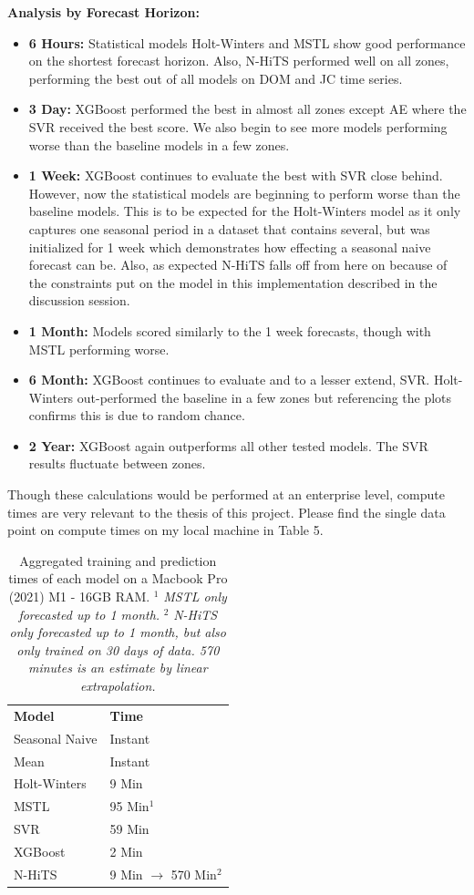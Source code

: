 \documentclass[sigconf]{acmart}
\begin{document}
\textbf{Analysis by Forecast Horizon:}
\begin{itemize}
\item\textbf{6 Hours:} Statistical models Holt-Winters and MSTL show good performance on the shortest forecast horizon. Also, N-HiTS performed well on all zones, performing the best out of all models on DOM and JC time series. 
\item\textbf{3 Day:} XGBoost performed the best in almost all zones except AE where the SVR received the best score. We also begin to see more models performing worse than the baseline models in a few zones.
\item\textbf{1 Week:} XGBoost continues to evaluate the best with SVR close behind. However, now the statistical models are beginning to perform worse than the baseline models. This is to be expected for the Holt-Winters model as it only captures one seasonal period in a dataset that contains several, but was initialized for 1 week which demonstrates how effecting a seasonal naive forecast can be. Also, as expected N-HiTS falls off from here on because of the constraints put on the model in this implementation described in the discussion session.
\item\textbf{1 Month:} Models scored similarly to the 1 week forecasts, though with MSTL performing worse.
\item\textbf{6 Month:} XGBoost continues to evaluate and to a lesser extend, SVR. Holt-Winters out-performed the baseline in a few zones but referencing the plots confirms this is due to random chance.
\item\textbf{2 Year:} XGBoost again outperforms all other tested models. The SVR results fluctuate between zones.
\end{itemize}

Though these calculations would be performed at an enterprise level, compute times are very relevant to the thesis of this project. Please find the single data point on compute times on my local machine in Table 5.

  \begin{table}[hbt!]
\centering
\caption{Aggregated training and prediction times of each model on a Macbook Pro (2021) M1 - 16GB RAM. $^{1}$ \textit{MSTL only forecasted up to 1 month.} $^{2}$ \textit{N-HiTS only forecasted up to 1 month, but also only trained on 30 days of data. 570 minutes is an estimate by linear extrapolation.}}
\begin{tabular}{ll}
\toprule
\textbf{Model} & \textbf{Time} \\
\cmidrule(rl){1-1}\cmidrule(rl){2-2}
  Seasonal Naive & Instant \\
  Mean & Instant  \\   
  Holt-Winters & 9 Min  \\   
  MSTL & 95 Min$^{1}$  \\ 
  SVR & 59 Min  \\ 
  XGBoost & 2 Min  \\ 
  N-HiTS & 9 Min $\rightarrow$ 570 Min$^{2}$  \\ 
  \bottomrule
\end{tabular}
\end{table}
\end{document}
